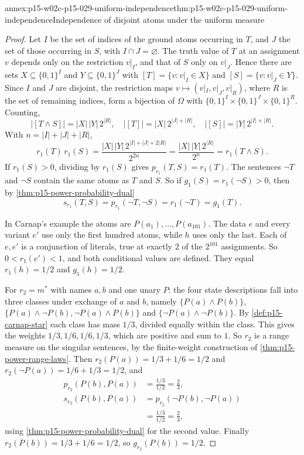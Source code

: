 \begin{annexitem}{annex:p15-w02c-p15-029-uniform-independence}{thm:p15-w02c-p15-029-uniform-independence}{Independence of disjoint atoms under the uniform measure}
\begin{proof}
Let \(I\) be the set of indices of the ground atoms occurring in \(T\),
and \(J\) the set of those occurring in \(S\), with \(I\cap J=\varnothing\).
The truth value of \(T\) at an assignment \(v\) depends only on the
restriction \(v|_I\), and that of \(S\) only on \(v|_J\). Hence there are
sets \(X\subseteq\{0,1\}^I\) and \(Y\subseteq\{0,1\}^J\) with
\([T]=\{v:v|_I\in X\}\) and \([S]=\{v:v|_J\in Y\}\). Since \(I\) and
\(J\) are disjoint, the restriction maps \(v\mapsto(v|_I,v|_J,v|_R)\),
where \(R\) is the set of remaining indices, form a bijection of
\(\Omega\) with \(\{0,1\}^I\times\{0,1\}^J\times\{0,1\}^R\). Counting,
\[
 |[T\land S]|=|X|\,|Y|\,2^{|R|},\quad
 |[T]|=|X|\,2^{|J|+|R|},\quad
 |[S]|=|Y|\,2^{|I|+|R|}.
\]
With \(n=|I|+|J|+|R|\),
\[
 r_1(T)\,r_1(S)=\frac{|X|\,|Y|\,2^{|I|+|J|+2|R|}}{2^{2n}}
 =\frac{|X|\,|Y|\,2^{|R|}}{2^{n}}=r_1(T\land S).
\]
If \(r_1(S)>0\), dividing by \(r_1(S)\) gives \(p_{r_1}(T,S)=r_1(T)\).
The sentences \(\neg T\) and \(\neg S\) contain the same atoms as \(T\)
and \(S\). So if \(g_1(S)=r_1(\neg S)>0\), then by
\cref{thm:p15-power-probability-dual}
\[
 s_{r_1}(T,S)=p_{r_1}(\neg T,\neg S)=r_1(\neg T)=g_1(T).
\]

In Carnap's example the atoms are \(P(a_1),\ldots,P(a_{101})\). The data
\(e\) and every variant \(e'\) use only the first hundred atoms, while
\(h\) uses only the last. Each of \(e,e'\) is a conjunction of literals,
true at exactly \(2\) of the \(2^{101}\) assignments. So
\(0<r_1(e')<1\), and both conditional values are defined. They equal
\(r_1(h)=1/2\) and \(g_1(h)=1/2\).

For \(r_2=m^\ast\) with names \(a,b\) and one unary \(P\): the four state
descriptions fall into three classes under exchange of \(a\) and \(b\),
namely \(\{P(a)\land P(b)\}\), \(\{P(a)\land\neg P(b),\neg P(a)\land P(b)\}\)
and \(\{\neg P(a)\land\neg P(b)\}\). By \cref{def:p15-carnap-star} each
class has mass \(1/3\), divided equally within the class. This gives the
weights \(1/3,1/6,1/6,1/3\), which are positive and sum to \(1\). So
\(r_2\) is a range measure on the singular sentences, by the
finite-weight construction of \cref{thm:p15-power-range-laws}. Then
\(r_2(P(a))=1/3+1/6=1/2\) and \(r_2(\neg P(a))=1/6+1/3=1/2\), and
\[
\begin{aligned}
 p_{r_2}(P(b),P(a))&=\frac{1/3}{1/2}=\frac23,\\[2pt]
 s_{r_2}(P(b),P(a))&=p_{r_2}(\neg P(b),\neg P(a))\\
 &=\frac{1/3}{1/2}=\frac23,
\end{aligned}
\]
using \cref{thm:p15-power-probability-dual} for the second value. Finally
\(r_2(P(b))=1/3+1/6=1/2\), so \(g_{r_2}(P(b))=1/2\).
\end{proof}
\end{annexitem}

